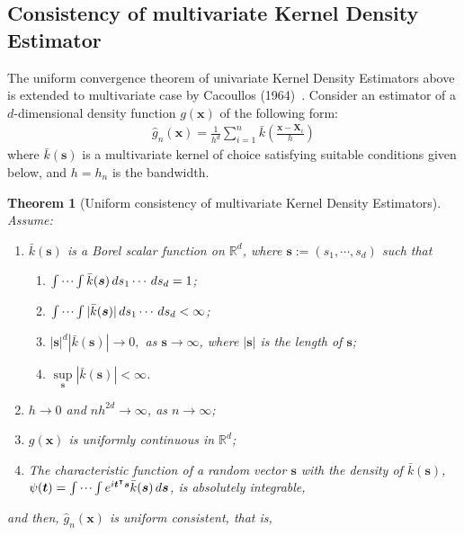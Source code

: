 \documentclass{article}
\newtheorem{theorem}{Theorem}[section]
\begin{document}
\begin{appendices}
\subsection{Consistency of multivariate Kernel Density Estimator }
The uniform convergence theorem of univariate Kernel Density Estimators above is extended to multivariate case by Cacoullos (1964)~\cite{Theo}. Consider an estimator of a $d$-dimensional density function $g(\boldsymbol{x})$ of the following form:
\begin{gather*}
\widehat{g}_n(\boldsymbol{x}) = \frac{1}{h^{d}} \sum_{i=1}^{n}\bar{k}\left( \frac{\boldsymbol{x} - \boldsymbol{X}_i}{h}\right)
\end{gather*}
where $\bar{k}(\boldsymbol{s})$ is a multivariate kernel of choice satisfying suitable conditions given below, and $h = h_n$ is the bandwidth. 
\begin{theorem}[Uniform consistency of multivariate Kernel Density Estimators]~\cite{Theo}
	Assume:
	\begin{enumerate}
		\item $\bar{k}(\boldsymbol{s})$ is a Borel scalar function on $\mathbb{R}^{d}$, where $\boldsymbol{s} := (s_1, \cdots, s_{d})$ such that 
		\begin{enumerate}
			\item $\idotsint \bar{k}(\boldsymbol{s}) \,ds_1\cdots \,ds_{d} = 1$;
			\item $\idotsint | \bar{k}(\boldsymbol{s}) | \,ds_1\cdots \,ds_{d}<\infty$;
			\item $|\boldsymbol{s}|^{d}|\bar{k}(\boldsymbol{s})| \to 0,$ as $\boldsymbol{s} \to \infty$, where $|\boldsymbol{s}|$ is the length of $\boldsymbol{s}$;
			\item $\underset{\boldsymbol{s}}{\sup} | \bar{k}(\boldsymbol{s}) | < \infty$.
		\end{enumerate}
		\item $h \to 0$ and $nh^{2d} \to \infty$, as $n \to \infty$;
		\item $g(\boldsymbol{x})$ is uniformly continuous in $\mathbb{R}^{d}$;
		\item The characteristic function of a random vector $\boldsymbol{s}$ with the density  of $\bar{k}(\boldsymbol{s})$, $\psi(\boldsymbol{t}) = \idotsint e^{i\boldsymbol{t}^{\intercal}\boldsymbol{s}} \bar{k}(\boldsymbol{s})\,d\boldsymbol{s}$,  is absolutely integrable,
	\end{enumerate}
	and then, $\widehat{g}_n(\boldsymbol{x})$ is uniform consistent, that is,
	\begin{gather*}

\end{gather*}
\end{theorem}
\end{appendices}
\end{document}
